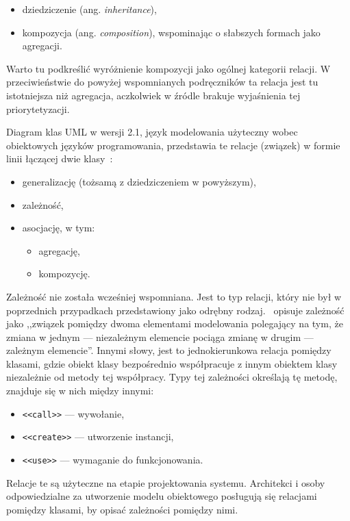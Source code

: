 \begin{itemize}
    \item dziedziczenie (ang. \textit{inheritance}),
    \item kompozycja (ang. \textit{composition}), wspominając o słabszych formach jako agregacji.
\end{itemize}

Warto tu podkreślić wyróżnienie kompozycji jako ogólnej kategorii relacji.
W przeciwieństwie do powyżej wspomnianych podręczników ta relacja jest tu istotniejsza niż agregacja, aczkolwiek w
źródle brakuje wyjaśnienia tej priorytetyzacji.

Diagram klas UML w wersji 2.1, język modelowania użyteczny wobec obiektowych języków programowania, przedstawia te
relacje (związek) w formie linii łączącej dwie klasy~\cite{dkabrowski2007modelowanie}:

\begin{itemize}
    \item generalizację (tożsamą z dziedziczeniem w powyższym),
    \item zależność,
    \item asocjację, w tym:
    \begin{itemize}
        \item agregację,
        \item kompozycję.
    \end{itemize}
\end{itemize}

Zależność nie została wcześniej wspomniana.
Jest to typ relacji, który nie był w poprzednich przypadkach przedstawiony jako odrębny rodzaj.
\cite{dkabrowski2007modelowanie}~opisuje zależność jako ,,związek pomiędzy dwoma elementami modelowania polegający
na tym, że zmiana w jednym --- niezależnym elemencie pociąga zmianę w drugim --- zależnym elemencie''.
Innymi słowy, jest to jednokierunkowa relacja pomiędzy klasami, gdzie obiekt klasy bezpośrednio współpracuje z innym
obiektem klasy niezależnie od metody tej współpracy.
Typy tej zależności określają tę metodę, znajduje się w nich między innymi:
\begin{itemize}
    \item \texttt{<<call>>} --- wywołanie,
    \item \texttt{<<create>>} --- utworzenie instancji,
    \item \texttt{<<use>>} --- wymaganie do funkcjonowania.
\end{itemize}

Relacje te są użyteczne na etapie projektowania systemu.
Architekci i osoby odpowiedzialne za utworzenie modelu obiektowego posługują się relacjami pomiędzy klasami, by
opisać zależności pomiędzy nimi.

